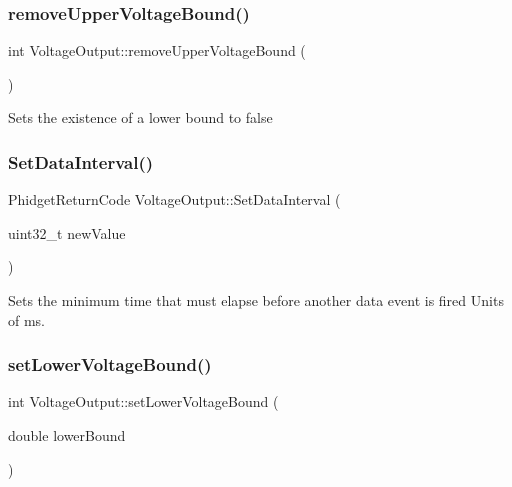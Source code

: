 \subsubsection{\texorpdfstring{remove\+Upper\+Voltage\+Bound()}{removeUpperVoltageBound()}}
{\footnotesize\ttfamily int Voltage\+Output\+::remove\+Upper\+Voltage\+Bound (\begin{DoxyParamCaption}{ }\end{DoxyParamCaption})\hspace{0.3cm}{\ttfamily [inline]}}

Sets the existence of a lower bound to false\mbox{\label{classVoltageOutput_af89b733d740081ac529ea890322a4e1b}} 
\subsubsection{\texorpdfstring{Set\+Data\+Interval()}{SetDataInterval()}}
{\footnotesize\ttfamily Phidget\+Return\+Code Voltage\+Output\+::\+Set\+Data\+Interval (\begin{DoxyParamCaption}\item[{uint32\+\_\+t}]{new\+Value }\end{DoxyParamCaption})\hspace{0.3cm}{\ttfamily [inline]}}

Sets the minimum time that must elapse before another data event is fired Units of ms.\mbox{\label{classVoltageOutput_ae368cb74e971d814564e08d6d4356291}} 
\subsubsection{\texorpdfstring{set\+Lower\+Voltage\+Bound()}{setLowerVoltageBound()}}
{\footnotesize\ttfamily int Voltage\+Output\+::set\+Lower\+Voltage\+Bound (\begin{DoxyParamCaption}\item[{double}]{lower\+Bound }\end{DoxyParamCaption})\hspace{0.3cm}{\ttfamily [inline]}}

